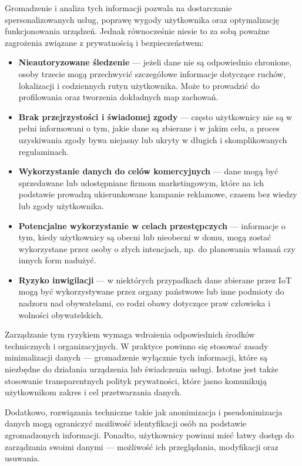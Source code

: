 Gromadzenie i analiza tych informacji pozwala na dostarczanie spersonalizowanych usług, poprawę wygody użytkownika oraz optymalizację funkcjonowania urządzeń. Jednak równocześnie niesie to za sobą poważne zagrożenia związane z prywatnością i bezpieczeństwem:

\begin{itemize}
\item \textbf{Nieautoryzowane śledzenie} — jeżeli dane nie są odpowiednio chronione, osoby trzecie mogą przechwycić szczegółowe informacje dotyczące ruchów, lokalizacji i codziennych rutyn użytkownika. Może to prowadzić do profilowania oraz tworzenia dokładnych map zachowań.

\item \textbf{Brak przejrzystości i świadomej zgody} — często użytkownicy nie są w pełni informowani o tym, jakie dane są zbierane i w jakim celu, a proces uzyskiwania zgody bywa niejasny lub ukryty w długich i skomplikowanych regulaminach.

\item \textbf{Wykorzystanie danych do celów komercyjnych} — dane mogą być sprzedawane lub udostępniane firmom marketingowym, które na ich podstawie prowadzą ukierunkowane kampanie reklamowe, czasem bez wiedzy lub zgody użytkownika.

\item \textbf{Potencjalne wykorzystanie w celach przestępczych} — informacje o tym, kiedy użytkownicy są obecni lub nieobecni w domu, mogą zostać wykorzystane przez osoby o złych intencjach, np. do planowania włamań czy innych form nadużyć.

\item \textbf{Ryzyko inwigilacji} — w niektórych przypadkach dane zbierane przez IoT mogą być wykorzystywane przez organy państwowe lub inne podmioty do nadzoru nad obywatelami, co rodzi obawy dotyczące praw człowieka i wolności obywatelskich.
\end{itemize}

Zarządzanie tym ryzykiem wymaga wdrożenia odpowiednich środków technicznych i organizacyjnych. W praktyce powinno się stosować zasady minimalizacji danych — gromadzenie wyłącznie tych informacji, które są niezbędne do działania urządzenia lub świadczenia usługi. Istotne jest także stosowanie transparentnych polityk prywatności, które jasno komunikują użytkownikom zakres i cel przetwarzania danych.

Dodatkowo, rozwiązania techniczne takie jak anonimizacja i pseudonimizacja danych mogą ograniczyć możliwość identyfikacji osób na podstawie zgromadzonych informacji. Ponadto, użytkownicy powinni mieć łatwy dostęp do zarządzania swoimi danymi — możliwość ich przeglądania, modyfikacji oraz usuwania.

